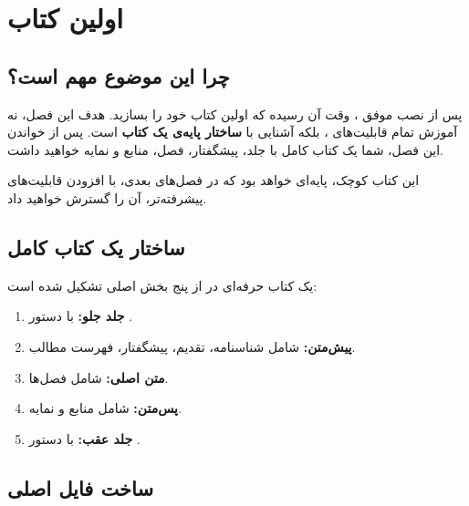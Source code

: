 
\chapter{اولین کتاب}
\label{chap:first-book}

\section{چرا این موضوع مهم است؟}
\label{sec:first-book-why}

پس از نصب موفق ، وقت آن رسیده که
اولین کتاب خود را بسازید. هدف این فصل، نه آموزش
تمام قابلیت‌های ، بلکه آشنایی با
\textbf{ساختار پایه‌ی یک کتاب} است. پس از خواندن
این فصل، شما یک کتاب کامل با جلد، پیشگفتار، فصل،
منابع و نمایه خواهید داشت.

این کتاب کوچک، پایه‌ای خواهد بود که در فصل‌های
بعدی، با افزودن قابلیت‌های پیشرفته‌تر، آن را
گسترش خواهید داد.


\section{ساختار یک کتاب کامل}
\label{sec:first-book-structure}

یک کتاب حرفه‌ای در  از پنج بخش
اصلی تشکیل شده است:

\begin{enumerate}
    \item \textbf{جلد جلو:} با دستور .
    \item \textbf{پیش‌متن:} شامل شناسنامه، تقدیم،
    پیشگفتار، فهرست مطالب.
    \item \textbf{متن اصلی:} شامل فصل‌ها.
    \item \textbf{پس‌متن:} شامل منابع و نمایه.
    \item \textbf{جلد عقب:} با دستور .
\end{enumerate}


\section{ساخت فایل اصلی}
\label{sec:first-book-main}

